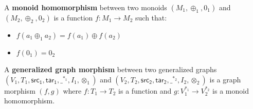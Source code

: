 \begin{definition}
  \label{Monoid-Homomorphism}
  A \textbf{monoid homomorphism} between two monoids $(M_1, \oplus_1, 0_1)$ and $(M_2, \oplus_2, 0_2)$
  is a function $f: M_1 \to M_2$ such that:
  \begin{itemize}
  \item $f(a_1 \oplus_1 a_2) = f(a_1) \oplus f(a_2)$
  \item $f (0_1) = 0_2$
  \end{itemize}
\end{definition}

\begin{definition}
  \label{Petri-net-morphism}
  A \textbf{generalized graph morphism} between two generalized graphs\\
  $(V_1, T_1, \mathsf{src_1}, \mathsf{tar_1}, \_^{*_1},I_1,\otimes_1)$ and
  $(V_2, T_2, \mathsf{src_2}, \mathsf{tar_2}, \_^{*_2},I_2,\otimes_2)$ is a graph morphism
  $(f, g)$ where $f : T_1 \to T_2$ is a function and
  $g: V_1^{*_1} \to V_2^{*_2}$ is a monoid homomorphism.
\end{definition}

